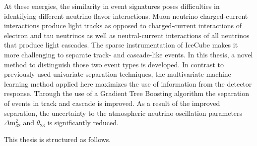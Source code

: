At these energies, the similarity in event signatures poses difficulties in identifying different neutrino flavor interactions.
Muon neutrino charged-current interactions produce light tracks as opposed to charged-current interactions of electron and tau neutrinos as well as neutral-current interactions of all neutrinos that produce light cascades.
The sparse instrumentation of IceCube makes it more challenging to separate track- and cascade-like events.
In this thesis, a novel method to distinguish those two event types is developed.
In contrast to previously used univariate separation techniques, the multivariate machine learning method applied here maximizes the use of information from the detector response.
Through the use of a Gradient Tree Boosting algorithm the separation of events in track and cascade is improved.
As a result of the improved separation, the uncertainty to the atmospheric neutrino oscillation parameters $\Delta \mathrm{m}^{2}_{32}$ and $\theta_{23}$ is significantly reduced.

This thesis is structured as follows. 


